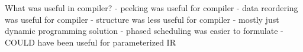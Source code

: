 What was useful in compiler?
- peeking was useful for compiler
- data reordering was useful for compiler
- structure was less useful for compiler
  - mostly just dynamic programming solution
  - phased scheduling was easier to formulate
  - COULD have been useful for parameterized IR




